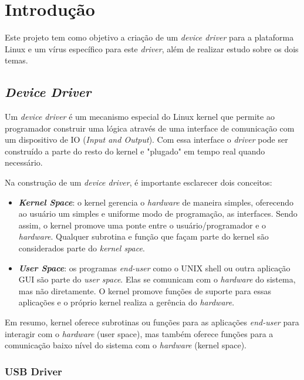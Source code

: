 \section{Introdução}

Este projeto tem como objetivo a criação de um \textit{device driver} para a
plataforma Linux e um vírus específico para este \textit{driver}, além de 
realizar estudo sobre os dois temas.

\subsection{\textit{Device Driver}}

Um \textit{device driver} é um mecanismo especial do Linux kernel que permite
ao programador construir uma lógica através de uma interface de comunicação
com um dispositivo de IO (\textit{Input and Output}). Com essa interface
o \textit{driver} pode ser construído a parte do resto do kernel e "plugado" em tempo
real quando necessário.

Na construção de um \textit{device driver}, é importante esclarecer dois conceitos:
\begin{itemize}
  \item \textit{\textbf{Kernel Space}}: o kernel gerencia o \textit{hardware} de maneira simples, oferecendo
    ao usuário um simples e uniforme modo de programação, as interfaces. Sendo assim,
    o kernel promove uma ponte entre o usuário/programador e o \textit{hardware}. Qualquer
    subrotina e função que façam parte do kernel são considerados parte do \textit{kernel space}.

  \item \textit{\textbf{User Space}}: os programas \textit{end-user} como o UNIX shell ou outra aplicação GUI são
    parte do \textit{user space}. Elas se comunicam com o \textit{hardware} do sistema, mas não diretamente.
    O kernel promove funções de suporte para essas aplicações e o próprio kernel realiza
    a gerência do \textit{hardware}.

\end{itemize}

Em resumo, kernel oferece subrotinas ou funções para as aplicações \textit{end-user} para interagir
com o \textit{hardware} (user space), mas também oferece funções para a comunicação baixo nível do sistema
com o \textit{hardware} (kernel space).

\subsubsection{USB Driver}

